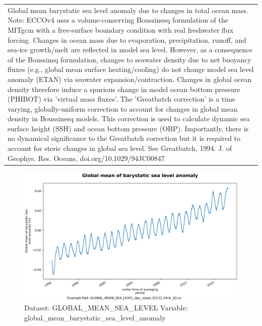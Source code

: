 \begin{longtable}{|p{}|p{}|p{}|p{}|}
\rowcolor{lightgray} \multicolumn{4}{|p{1.00\textwidth}|}{\textbf{Comments}} \\ \hline
\multicolumn{4}{|p{1\textwidth}|}{Global mean barystatic sea level anomaly due to changes in total ocean mass. Note: ECCOv4 uses a volume-conserving Boussinesq formulation of the MITgcm with a free-surface boundary condition with real freshwater flux forcing. Changes in ocean mass due to evaporation, precipitation, runoff, and sea-ice growth/melt are reflected in model sea level. However, as a consequence of the Boussinsq formulation, changes to seawater density due to net buoyancy fluxes (e.g., global mean surface heating/cooling) do not change model sea level anomaly (ETAN) via seawater expansion/contraction. Changes in global ocean density therefore induce a spurious change in model ocean bottom pressure (PHIBOT) via 'virtual mass fluxes'. The 'Greatbatch correction' is a time varying, globally-uniform correction to account for changes in global mean density in Boussinesq models. This correction is used to calculate dynamic sea surface height (SSH) and ocean bottom pressure (OBP). Importantly, there is no dynamical significance to the Greatbatch correction but it is required to account for steric changes in global sea level. See Greatbatch, 1994. J. of Geophys. Res. Oceans, doi.org/10.1029/94JC00847} \\ \hline
\end{longtable}

\begin{figure}[H]
\centering
\includegraphics[width=\textwidth]{../images/plots/oneD_plots/Global_Mean_Sea_Level/global_mean_barystatic_sea_level_anomaly.png}
\caption{Dataset: GLOBAL\_MEAN\_SEA\_LEVEL Variable: global\_mean\_barystatic\_sea\_level\_anomaly}
\label{tab:table-GLOBAL_MEAN_SEA_LEVEL_global_mean_barystatic_sea_level_anomaly-Plot}
\end{figure}
\pagebreak
